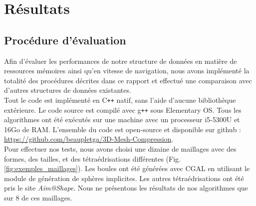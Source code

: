 \section{Résultats}
\subsection{Procédure d'évaluation}
\noindent
Afin d'évaluer les performances de notre structure de données en matière de ressources mémoires ainsi qu'en vitesse de navigation, nous avons implémenté la totalité des procédures décrites dans ce rapport et effectué une comparaison avec d'autres structures de données existantes.\\
Tout le code est implémenté en C\texttt{++} natif, sans l'aide d'aucune bibliothèque extérieure. Le code source est compilé avec g\texttt{++} sous Elementary OS. Tous les algorithmes ont été exécutés sur une machine avec un processeur i5-5300U et 16Go de RAM. L'ensemble du code est open-source et disponible sur github : \url{https://github.com/beaupletga/3D-Mesh-Compression}.\\
Pour effectuer nos tests, nous avons choisi une dizaine de maillages avec des formes, des tailles, et des tétraédrisations différentes (Fig. \ref{fig:exemples_maillages}). Les boules ont été générées avec CGAL \cite{CGAL} en utilisant le module de génération de sphères implicites. Les autres tétraédrisations ont été pris le site \textit{Aim@Shape}. Nous ne présentons les résultats de nos algorithmes que sur 8 de ces maillages.
